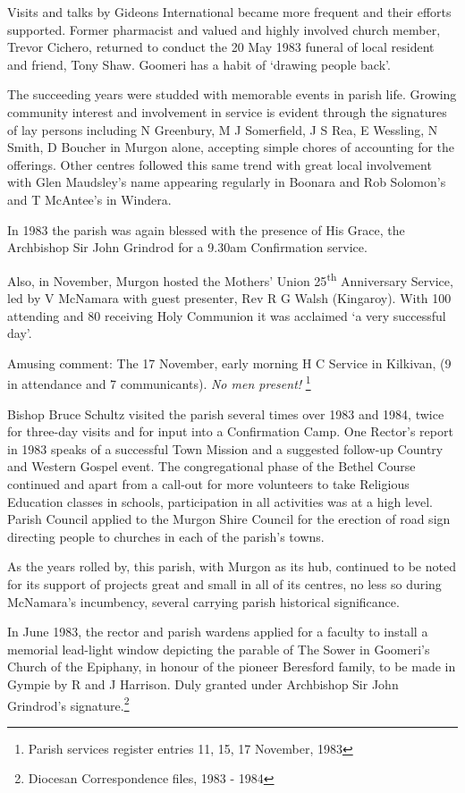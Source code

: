 Visits and talks by Gideons International became more frequent and their efforts supported. Former pharmacist and valued and highly involved church member, Trevor Cichero, returned to conduct the 20 May 1983 funeral of local resident and friend, Tony Shaw. Goomeri has a habit of `drawing people back'.

The succeeding years were studded with memorable events in parish life. Growing community interest and involvement in service is evident through the signatures of lay persons including N Greenbury, M J Somerfield, J S Rea, E Wessling, N Smith, D Boucher in Murgon alone, accepting simple chores of accounting for the offerings. Other centres followed this same trend with great local involvement with Glen Maudsley's name appearing regularly in Boonara and Rob Solomon's and T McAntee's in Windera.

In 1983 the parish was again blessed with the presence of His Grace, the Archbishop Sir John Grindrod for a 9.30am Confirmation service.

Also, in November, Murgon hosted the Mothers' Union 25\textsuperscript{th} Anniversary Service, led by V McNamara with guest presenter, Rev R G Walsh (Kingaroy). With 100 attending and 80 receiving Holy Communion it was acclaimed `a very successful day'.

Amusing comment: The 17 November, early morning H C Service in Kilkivan, (9 in attendance and 7 communicants). \emph{No men present!} \footnote{Parish services register entries 11, 15, 17 November, 1983}

Bishop Bruce Schultz visited the parish several times over 1983 and 1984, twice for three-day visits and for input into a Confirmation Camp. One Rector's report in 1983 speaks of a successful Town Mission and a suggested follow-up Country and Western Gospel event. The congregational phase of the Bethel Course continued and apart from a call-out for more volunteers to take Religious Education classes in schools, participation in all activities was at a high level. Parish Council applied to the Murgon Shire Council for the erection of road sign directing people to churches in each of the parish's towns.

As the years rolled by, this parish, with Murgon as its hub, continued to be noted for its support of projects great and small in all of its centres, no less so during McNamara's incumbency, several carrying parish historical significance.

In June 1983, the rector and parish wardens applied for a faculty to install a memorial lead-light window depicting the parable of The Sower in Goomeri's Church of the Epiphany, in honour of the pioneer Beresford family, to be made in Gympie by R and J Harrison. Duly granted under Archbishop Sir John Grindrod's signature.\footnote{Diocesan Correspondence files, 1983 - 1984}

